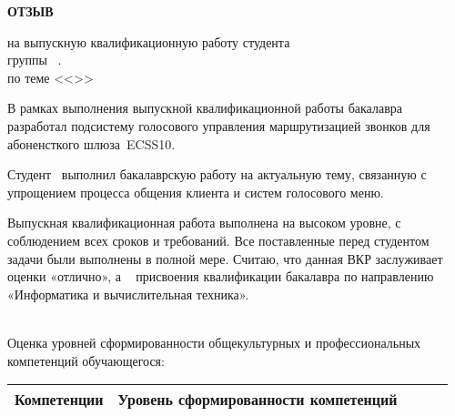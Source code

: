 
\vspace{0.1cm}
\begin{center}
    \LARGE
    {\bf ОТЗЫВ} \\
    \normalsize
\end{center}
\begin{center}
    на выпускную квалификационную работу студента \\
    группы \group\ \fio. \\
    по теме <<\topicname>>
\end{center}

В рамках выполнения выпускной квалификационной работы бакалавра \\ \fioa
разработал подсистему голосового управления маршрутизацией звонков для
абоненсткого шлюза~ECSS10.

Студент \fio~выполнил бакалаврскую работу на актуальную тему, связанную с
упрощением процесса общения клиента и систем голосового меню.

Выпускная квалификационная работа \fio выполнена на высоком уровне, с соблюдением
всех сроков и требований. Все поставленные перед студентом задачи были выполнены
в полной мере. Считаю, что данная ВКР заслуживает оценки «отлично», а \fio~
присвоения квалификации бакалавра по направлению «Информатика и вычислительная техника».

\hfill \\

Оценка уровней сформированности общекультурных и профессиональных
компетенций обучающегося:

\begin{table}[b]
    \begin{tabular}{|c|c|c|c|c|}
        \hline
        Компетенции & Уровень сформированности компетенций \\
        \hline
    \end{tabular}
\end{table}
\thispagestyle{empty}
\newpage
